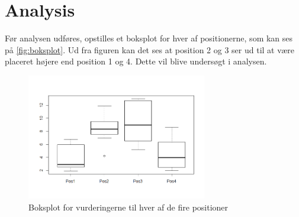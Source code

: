 \section*{Analysis}
\label{analysis}
Før analysen udføres, opstilles et boksplot for hver af positionerne, som kan ses på \autoref{fig:boksplot}. Ud fra figuren kan det ses at position 2 og 3 ser ud til at være placeret højere end position 1 og 4. Dette vil blive undersøgt i analysen.

\begin{figure}[H]
\centering
\includegraphics[width = 0.7\textwidth]{Figure/Rplot.png} 
\caption{Boksplot for vurderingerne til hver af de fire positioner}
\label{fig:boksplot}
\end{figure}

